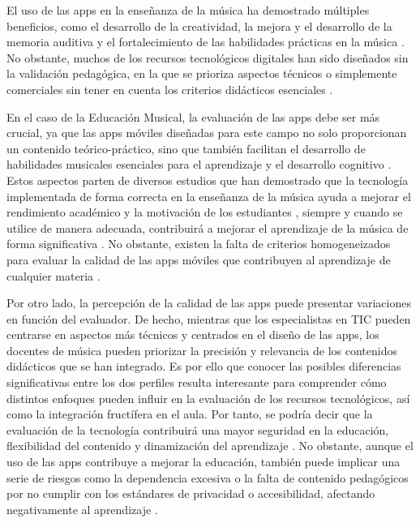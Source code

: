 \documentclass[spanish]{textolivre}
\begin{document}
El uso de las apps en la enseñanza de la música ha demostrado múltiples beneficios, como el desarrollo de la creatividad, la mejora y el desarrollo de la memoria auditiva y el fortalecimiento de las habilidades prácticas en la música  \cite{akombo2019, cheng2023, han2023, barroso-osuna2024}. No obstante, muchos de los recursos tecnológicos digitales han sido diseñados sin la validación pedagógica, en la que se prioriza aspectos técnicos o simplemente comerciales sin tener en cuenta los criterios didácticos esenciales \cite{hirsh-pasek2015, merchant2020}. 

En el caso de la Educación Musical, la evaluación de las apps debe ser más crucial, ya que las apps móviles diseñadas para este campo no solo proporcionan un contenido teórico-práctico, sino que también facilitan el desarrollo de habilidades musicales esenciales para el aprendizaje y el desarrollo cognitivo \cite{dominguez-lloria2023, meneses-rodriguez2024}. Estos aspectos parten de diversos estudios que han demostrado que la tecnología implementada de forma correcta en la enseñanza de la música ayuda a mejorar el rendimiento académico y la motivación de los estudiantes \cite{vela-gonzalez2020, riano2022}, siempre y cuando se utilice de manera adecuada, contribuirá a mejorar el aprendizaje de la música de forma significativa \cite{aufegger2020, joseph2023}. No obstante, existen la falta de criterios homogeneizados para evaluar la calidad de las apps móviles que contribuyen al aprendizaje de cualquier materia \cite{delgado-morales2023, quezada-bolanos2023}.

Por otro lado, la percepción de la calidad de las apps puede presentar variaciones en función del evaluador. De hecho, mientras que los especialistas en TIC pueden centrarse en aspectos más técnicos y centrados en el diseño de las apps, los docentes de música pueden priorizar la precisión y relevancia de los contenidos didácticos que se han integrado. Es por ello que conocer las posibles diferencias significativas entre los dos perfiles resulta interesante para comprender cómo distintos enfoques pueden influir en la evaluación de los recursos tecnológicos, así como la integración fructífera en el aula. Por tanto, se podría decir que la evaluación de la tecnología contribuirá una mayor seguridad en la educación, flexibilidad del contenido y dinamización del aprendizaje \cite{uribe-guerrero2023}. No obstante, aunque el uso de las apps contribuye a mejorar la educación, también puede implicar una serie de riesgos como la dependencia excesiva o la falta de contenido pedagógicos por no cumplir con los estándares de privacidad o accesibilidad, afectando negativamente al aprendizaje \cite{joseph2023}. 
\end{document}
